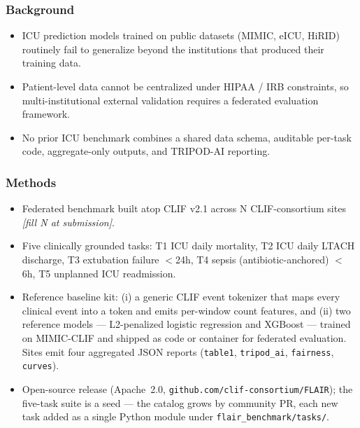 \documentclass[11pt]{article}
\newcommand{\note}[1]{{\color{notecolor}\textit{[#1]}}}
\begin{document}
\subsubsection*{Background}
\begin{itemize}[leftmargin=1.5em]
  \item ICU prediction models trained on public datasets (MIMIC, eICU,
        HiRID) routinely fail to generalize beyond the institutions that
        produced their training data.
  \item Patient-level data cannot be centralized under HIPAA / IRB
        constraints, so multi-institutional external validation requires
        a federated evaluation framework.
  \item No prior ICU benchmark combines a shared data schema, auditable
        per-task code, aggregate-only outputs, and TRIPOD-AI reporting.
\end{itemize}

\subsubsection*{Methods}
\begin{itemize}[leftmargin=1.5em]
  \item Federated benchmark built atop CLIF v2.1 across N CLIF-consortium
        sites \note{fill N at submission}.
  \item Five clinically grounded tasks: T1 ICU daily mortality, T2 ICU
        daily LTACH discharge, T3 extubation failure $<$24h, T4 sepsis
        (antibiotic-anchored) $<$6h, T5 unplanned ICU readmission.
  \item Reference baseline kit: (i) a generic CLIF event tokenizer that
        maps every clinical event into a token and emits per-window
        count features, and (ii) two reference models --- L2-penalized
        logistic regression and XGBoost --- trained on MIMIC-CLIF and
        shipped as code or container for federated
        evaluation. Sites emit four aggregated JSON reports
        (\texttt{table1}, \texttt{tripod\_ai}, \texttt{fairness},
        \texttt{curves}).
  \item Open-source release (Apache~2.0,
        \texttt{github.com/clif-consortium/FLAIR}); the five-task suite
        is a seed --- the catalog grows by community PR, each new task
        added as a single Python module under
        \texttt{flair\_benchmark/tasks/}.
\end{itemize}
\end{document}
